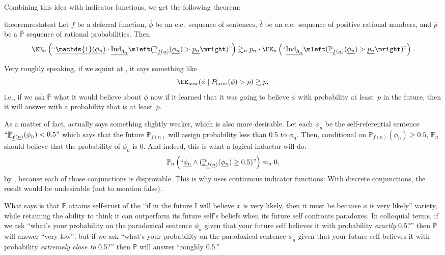 \documentclass[authordate,onecolumn,noenvironments]{miri-tech-article}
\numberwithin{equation}{subsection}
\newcommand{\quot}[1]{``#1"}
\newcommand{\enc}[1]{{\underline{#1}}}
\newcommand{\seq}[1]{{\overline{#1}}}
\newcommand{\prob}{p}
\newcommand{\nn}{n}
\newcommand{\deff}{f}
\newcommand{\phis}{\seq{\phi}}
\newcommand{\deltas}{\seq{\delta}}
\newcommand{\probs}{\seq{{\prob}}}
\newcommand{\ec}[1][\ ]{e.c.#1}
\newcommand{\pgenable}{\ensuremath{\MP}\text{-generable}\xspace}
\newcommand{\rparenthetical}[1]{\hfill\upshape{{\small (#1)}}} %
\newcommand{\proofin}[1]{\rparenthetical{Proof in:~#1.}}
\newcommand{\BelState}{\mathbb{P}}
\newcommand{\pt}{\BelState}
\newcommand{\MP}{\seq{\pt}}
\DeclareMathOperator{\OneOperator}{\mathds{1}}
\newcommand{\ctsind}[1]{\operatorname{Ind}_{\text{\small{${#1}$}}}} %
\begin{document}
Combining this idea with indicator functions, we get the following theorem:
\begin{restatable}{theorem}{restatest}\label{thm:st}
  Let $\deff$ be a deferral function, $\phis$ be an \ec sequence of sentences, $\deltas$ be an \ec sequence of positive rational numbers, and $\probs$ be a \pgenable sequence of rational probabilities. Then
  \[
    \EE_\nn\left(\quot{
      \enc{\OneOperator(\phi_\nn)} \cdot
      \enc{\ctsind{\delta_\nn}}\mleft(
        \enc{\pt}_{\enc{\deff}(\enc{\nn})}(\enc{\phi_\nn}) > \enc{\prob_\nn}
      \mright)
    }\right)
    \gtrsim_\nn
    \prob_\nn \cdot
    \EE_\nn\left(\quot{
      \enc{\ctsind{\delta_\nn}}\mleft(
        \enc{\pt}_{\enc{\deff}(\enc{\nn})}(\enc{\phi_\nn}) > \enc{\prob_\nn}
      \mright)
    }\right).
  \]
  \proofin{\ref{app:st}}
\end{restatable}
\noindent Very roughly speaking, if we squint at , it says something like 
\[
    \EE_\mathrm{now}(\phi \mid P_\mathrm{later}(\phi) > \prob) \gtrsim \prob,
\]
i.e., if we ask $\MP$ what it would believe about $\phi$ now if it learned that it was going to believe $\phi$ with probability at least~$\prob$ in the future, then it will answer with a probability that is at least~$\prob$.

As a matter of fact,  actually says something slightly weaker, which is also more desirable. Let each $\phi_\nn$ be the self-referential sentence $\quot{\enc{\pt}_{\enc{\deff}(\enc{\nn})}(\enc{\phi_\nn}) < 0.5}$ which says that the future $\pt_{\deff(\nn)}$ will assign probability less than 0.5 to $\phi_\nn$. Then, conditional on $\pt_{\deff(\nn)}(\phi_\nn) \ge 0.5$, $\pt_\nn$ should believe that the probability of $\phi_\nn$ is 0. And indeed, this is what a logical inductor will do:
\[
  \pt_\nn\left(
    \quot{\enc{\phi_\nn} \land
    (
      \enc{\pt}_{\enc{\deff}(\enc{\nn})}(
        \enc{\phi_\nn}
      ) \ge 0.5
    )}
  \right) \eqsim_\nn 0,
\]
by , because each of those conjunctions is disprovable. This is why  uses continuous indicator functions: With discrete conjunctions, the result would be undesirable (not to mention false).

What  says is that $\MP$ attains self-trust of the ``if in the future I will believe $x$ is very likely, then it must be because $x$ is very likely'' variety, while retaining the ability to think it can outperform its future self's beliefs when its future self confronts paradoxes. In colloquial terms, if we ask ``what's your probability on the paradoxical sentence $\phi_\nn$ given that your future self believes it with probability \emph{exactly} 0.5?'' then $\MP$ will answer ``very low'', but if we ask ``what's your probability on the paradoxical sentence $\phi_\nn$ given that your future self believes it with probability \emph{extremely close to} 0.5?'' then $\MP$ will answer ``roughly 0.5.''
\end{document}
